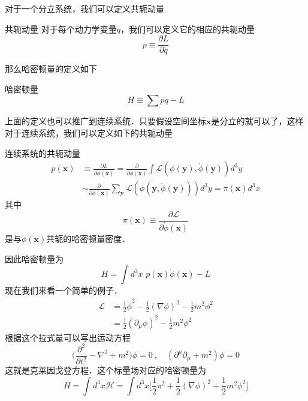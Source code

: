 对于一个分立系统，我们可以定义共轭动量
\begin{definition}{共轭动量}
对于每个动力学变量$q$，我们可以定义它的相应的共轭动量
\begin{equation}
p \equiv \frac{\partial L}{\partial \dot q}
\end{equation}
\end{definition}
那么哈密顿量的定义如下
\begin{definition}{哈密顿量}
\begin{equation}
H \equiv \sum p \dot q - L
\end{equation}
\end{definition}
上面的定义也可以推广到连续系统．只要假设空间坐标$\mathbf x$是分立的就可以了，这样对于连续系统，我们可以定义如下的共轭动量
\begin{definition}{连续系统的共轭动量}
\begin{equation}
\begin{aligned}
p(\mathbf x) & \equiv \frac{\partial L}{\partial \dot \phi(\mathbf x)} = \frac{\partial}{\partial \dot \phi(\mathbf x)} \int \mathcal L(\phi(\mathbf y),\dot \phi(\mathbf y)) d^3 y \\
& \sim \frac{\partial}{\partial \dot \phi(\mathbf x)} \sum_{\mathbf y} \mathcal L(\phi(\mathbf y,\dot \phi(\mathbf y))) d^3 y=\pi(\mathbf x) d^3 x
\end{aligned}
\end{equation}
其中
\begin{equation}
\pi(\mathbf x) \equiv \frac{\partial \mathcal L}{\partial \dot \phi(\mathbf x)}
\end{equation}
是与$\phi(\mathbf x)$共轭的哈密顿量密度．
\end{definition}
因此哈密顿量为
\begin{equation}
H = \int d^3 x\,\, p(\mathbf x) \dot \phi(\mathbf x) - L
\end{equation}
现在我们来看一个简单的例子．
\begin{align}\nonumber
\mathcal L & = \frac{1}{2} \dot \phi^2 - \frac{1}{2} (\nabla \phi)^2 - \frac{1}{2} m^2 \phi^2 \\
& = \frac{1}{2} (\partial_\mu\phi)^2 - \frac{1}{2} m^2 \phi^2
\end{align}
根据这个拉式量可以写出运动方程
\begin{equation}
\bigg( \frac{\partial^2}{\partial t^2} - \nabla^2 +m^2 \bigg)\phi = 0~,\quad (\partial^\mu\partial_\mu+m^2)\phi = 0
\end{equation}
这就是克莱因戈登方程．这个标量场对应的哈密顿量为
\begin{equation}
H =  \int d^3x \mathcal H = \int d^3 x \bigg[ \frac{1}{2} \pi^2 + \frac{1}{2} (\nabla \phi)^2 + \frac{1}{2} m^2 \phi^2 \bigg] 
\end{equation} 

